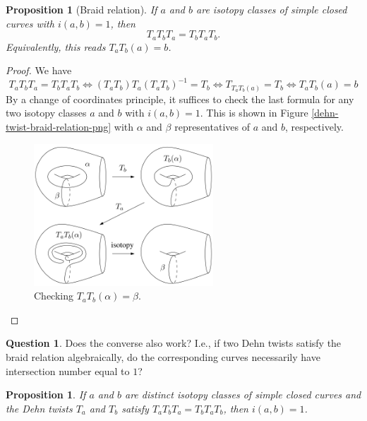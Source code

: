 \documentclass[reqno]{amsart}
\newtheorem{proposition}[theorem]{Proposition}
\theoremstyle{definition}
\newtheorem{question}[theorem]{Question}
\theoremstyle{remark}
\begin{document}
\begin{proposition}[Braid relation]\label{dehn-braid-relation}
    If $a$ and $b$ are isotopy classes of simple closed
    curves with $i(a,b) = 1$, then
    \[
    T_a T_b T_a = T_b T_a T_b.
    \] 
    Equivalently, this reads
    $T_a T_b(a) = b$.
\end{proposition}

\begin{proof}
    We have
    \[
    T_a T_b T_a = T_b T_a T_b \iff
    \left( T_a T_b \right) T_a \left( T_a T_b \right)^{-1}
    = T_b
    \iff
    T_{T_a T_b (a)} = T_b
    \iff
    T_a T_b (a) = b
    \] 
    By a change of coordinates principle, it suffices
    to check the last
    formula for any two isotopy classes
    $a$ and $b$ with $i(a,b) = 1$. This is
    shown in Figure \ref{dehn-twist-braid-relation-png}
    with $\alpha$ and $\beta$ representatives of
    $a$ and $b$, respectively.

    \begin{figure}[H]
        \centering
        \includegraphics[width=0.6\textwidth]{dehn-twist-braid-relation.png}
        \caption{Checking
        $T_a T_b \left( \alpha \right) =
    \beta$.}
        \label{fig:dehn-twist-braid-relation-png}
    \end{figure}
    
\end{proof}

\begin{question}
    Does the converse also work? I.e., if two Dehn twists
    satisfy the braid relation algebraically, do the
    corresponding curves necessarily have intersection
    number equal to $1$?
\end{question}

\begin{proposition}\cite[Proposition 3.13]{Farb-Margalit}
    If $a$ and $b$ are distinct isotopy classes of simple closed
    curves and the Dehn twists $T_a$ and $T_b$ satisfy
    $T_a T_b T_a = T_b T_a T_b$, then
    $i(a,b) = 1$.
\end{proposition}
\end{document}
